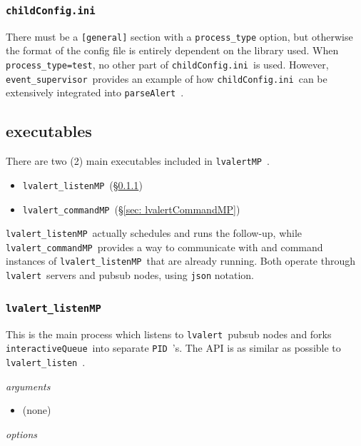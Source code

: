 \documentclass{article}
\newcommand{\PID}{\texttt{PID}~}
\newcommand{\alert}{\texttt{lvalert}~}
\newcommand{\lvalertListen}{\texttt{lvalert\_listen}~}
\newcommand{\lvalertMP}{\texttt{lvalertMP}~}
\newcommand{\lvalertListenMP}{\texttt{lvalert\_listenMP}~}
\newcommand{\lvalertCommandMP}{\texttt{lvalert\_commandMP}~}
\newcommand{\interactiveQueue}{\texttt{interactiveQueue}~}
\newcommand{\parseAlert}{\texttt{parseAlert}~}
\newcommand{\childConfigini}{\texttt{childConfig.ini}~}
\newcommand{\eventSupervisor}{\texttt{event\_supervisor}~}
\begin{document}

\subsubsection{\childConfigini}
\label{sec: childConfigini}

There must be a \texttt{[general]} section with a \texttt{process\_type} option, but otherwise the format of the config file is entirely dependent on the library used.
When \texttt{process\_type=test}, no other part of \childConfigini is used.
However, \eventSupervisor provides an example of how \childConfigini can be extensively integrated into \parseAlert.


\subsection{executables}
\label{sec: executables}

There are two (2) main executables included in \lvalertMP.

\begin{itemize}
    \item{\lvalertListenMP (\S\ref{sec: lvalertListenMP})}
    \item{\lvalertCommandMP (\S\ref{sec: lvalertCommandMP})}
\end{itemize}

\lvalertListenMP actually schedules and runs the follow-up, while \lvalertCommandMP provides a way to communicate with and command instances of \lvalertListenMP that are already running.
Both operate through \alert servers and pubsub nodes, using \texttt{json} notation.


\subsubsection{\lvalertListenMP}
\label{sec: lvalertListenMP}

This is the main process which listens to \alert pubsub nodes and forks \interactiveQueue into separate \PID's. 
The API is as similar as possible to \lvalertListen.

\vspace{0.5cm}
\noindent
\textit{arguments}
\begin{itemize}
    \item{(none)}
\end{itemize}

\noindent
\textit{options}
\end{document}
